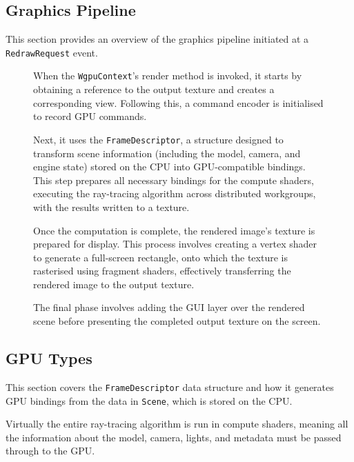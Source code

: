 \subsection{Graphics Pipeline}
This section provides an overview of the graphics pipeline initiated at a \verb|RedrawRequest| event.

\begin{figure}[H]
\noindent\begin{minipage}[t]{0.75\textwidth}
  \vspace{0.5cm}
  When the \verb|WgpuContext|'s render method is invoked, it starts by obtaining a reference to the output texture and creates a corresponding view. Following this, a command encoder is initialised to record GPU commands.

  Next, it uses the \verb|FrameDescriptor|, a structure designed to transform scene information (including the model, camera, and engine state) stored on the CPU into GPU-compatible bindings. This step prepares all necessary bindings for the compute shaders, executing the ray-tracing algorithm across distributed workgroups, with the results written to a texture.

  Once the computation is complete, the rendered image's texture is prepared for display. This process involves creating a vertex shader to generate a full-screen rectangle, onto which the texture is rasterised using fragment shaders, effectively transferring the rendered image to the output texture.

  The final phase involves adding the GUI layer over the rendered scene before presenting the completed output texture on the screen.
\end{minipage}
\hfill
\begin{minipage}[t]{0.24\textwidth}
  \vspace{-0.5cm}
  \begin{figure}[H]
    \centering
    
  \end{figure}
\end{minipage}
\end{figure}

\subsection{GPU Types}\label{gputypes}
This section covers the \verb|FrameDescriptor| data structure and how it generates GPU bindings from the data in \verb|Scene|, which is stored on the CPU.

Virtually the entire ray-tracing algorithm is run in compute shaders, meaning all the information about the model, camera, lights, and metadata must be passed through to the GPU.

